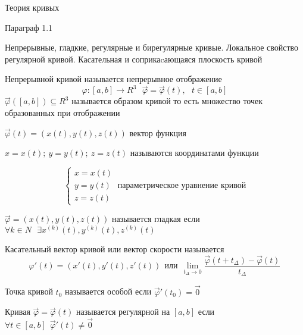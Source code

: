 \begin{title}
  Теория кривых
\end{title}

\begin{title}[\Large]
  Параграф 1.1
\end{title}

\begin{title}[\Large]
  Непрерывные, гладкие, регулярные и бирегулярные кривые. Локальное свойство
  регулярной кривой. Касательная и соприкаcающаяся плоскость кривой
\end{title}

\begin{define}
  Непрерывной кривой называется непрерывное отображение
  $$
  \varphi: [a,b] \to R^3 ~~~ \vec \varphi = \vec \varphi (t), ~~~ t \in [a,b]
  $$
  $\vec \varphi ([a,b]) \subseteq R^3$ называется образом кривой то есть
  множество точек образованных при отображении

  $\vec \varphi (t) = ( x(t), y(t), z(t) )$ вектор функция

  $x = x(t); ~ y = y(t); ~ z = z(t)$ называются координатами функции

  $$
  \left\{
  \begin{array}{c}
    x = x(t) \\
    y = y(t) \\
    z = z(t)
  \end{array}
  \right. ~ \text{параметрическое уравнение кривой}
  $$
\end{define}

\begin{define}
  $\vec \varphi = ( x(t), y(t), z(t) )$ называется гладкая если $\forall k \in N
  ~~~ \exists x^{(k)}(t), y^{(k)}(t), z^{(k)}(t)$
\end{define}

\begin{define}
  Касательный вектор кривой или вектор скорости называется
  $$
  \varphi' (t) = ( x'(t), y'(t), z'(t) ) ~~ \text{или} ~~
  \lim_{ t_{\Delta} \to 0 }
  \frac{ \vec \varphi (t + t_{\Delta}) - \vec \varphi (t) }{t_{\Delta}}
  $$
\end{define}

\begin{define}
  Точка кривой $t_0$ называется особой если $\vec \varphi' (t_0) = \vec 0$
\end{define}

\begin{define}
  Кривая $\vec \varphi = \vec \varphi (t)$ называется регулярной на $[a,b]$ если
  $\forall t \in [a,b] ~~ \vec \varphi' (t) \not = \vec 0$
\end{define}

